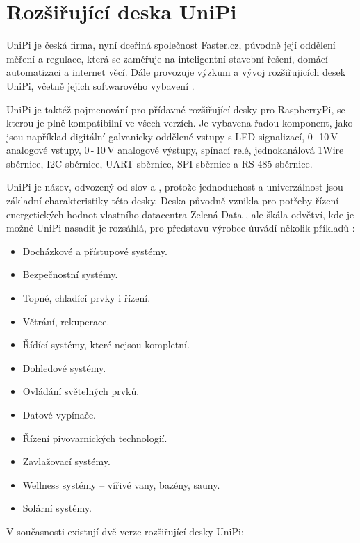 \chapter{Rozšiřující deska UniPi}
\label{KapUnipi}

UniPi je česká firma, nyní dceřiná společnost Faster.cz, původně její oddělení měření a regulace, která se zaměřuje na inteligentní stavební řešení, domácí automatizaci a internet věcí. Dále provozuje výzkum a vývoj rozšiřujicích desek UniPi, včetně jejich softwarového vybavení \cite{UniPiBoard}.

UniPi je taktéž pojmenování pro přídavné rozšiřující desky pro RaspberryPi, se kterou je plně kompatibilní ve všech verzích. Je vybavena řadou komponent, jako jsou například digitální galvanicky oddělené vstupy s LED signalizací, 0\,-\,10\,V analogové vstupy, 0\,-\,10\,V analogové výstupy, spínací relé, jednokanálová 1Wire sběrnice, I2C sběrnice, UART sběrnice, SPI sběrnice a RS-485 sběrnice.

UniPi je název, odvozený od slov  a , protože jednoduchost a univerzálnost jsou základní charakteristiky této desky. Deska původně vznikla pro potřeby řízení energetických hodnot vlastního datacentra Zelená Data \cite{ZelenaData}, ale škála odvětví, kde je možné UniPi nasadit je rozsáhlá, pro představu výrobce úuvádí několik příkladů \cite{UniPiBoard}:
\begin{itemize}
	\item Docházkové a přístupové systémy.
	\item Bezpečnostní systémy.
	\item Topné, chladící prvky i řízení.
	\item Větrání, rekuperace.
	\item Řídící systémy, které nejsou kompletní.
	\item Dohledové systémy.
	\item Ovládání světelných prvků.
	\item Datové vypínače.
	\item Řízení pivovarnických technologií.
	\item Zavlažovací systémy.
	\item Wellness systémy – vířivé vany, bazény, sauny.
	\item Solární systémy.
\end{itemize}

\vspace{5mm}
\noindent
 V současnosti existují dvě verze rozšiřující desky UniPi:


